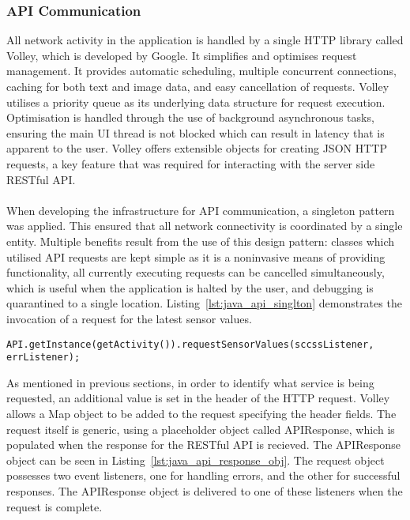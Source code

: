 \documentclass{article}
\begin{document}
\subsubsection{API Communication}
All network activity in the application is handled by a single HTTP library called Volley, which is developed by Google. It simplifies and optimises request management. It provides automatic scheduling, multiple concurrent connections, caching for both text and image data, and easy cancellation of requests. Volley utilises a priority queue as its underlying data structure for request execution. Optimisation is handled through the use of background asynchronous tasks, ensuring the main UI thread is not blocked which can result in latency that is apparent to the user. Volley offers extensible objects for creating JSON HTTP requests, a key feature that was required for interacting with the server side RESTful API.	\\\\
When developing the infrastructure for API communication, a singleton pattern was applied. This ensured that all network connectivity is coordinated by a single entity. Multiple benefits result from the use of this design pattern: classes which utilised API requests are kept simple as it is a noninvasive means of providing functionality, all currently executing requests can be cancelled simultaneously, which is useful when the application is halted by the user, and debugging is quarantined to a single location. Listing~\ref{lst:java_api_singlton} demonstrates the invocation of a request for the latest sensor values. 

\begin{lstlisting}[caption={Singleton API object method invocation},label={lst:java_api_singlton}]
API.getInstance(getActivity()).requestSensorValues(sccssListener, errListener);
\end{lstlisting}

\noindent
As mentioned in previous sections, in order to identify what service is being requested, an additional value is set in the header of the HTTP request. Volley allows a Map object to be added to the request specifying the header fields. The request itself is generic, using a placeholder object called APIResponse, which is populated when the response for the RESTful API is recieved. The APIResponse object can be seen in Listing~\ref{lst:java_api_response_obj}. The request object possesses two event listeners, one for handling errors, and the other for successful responses. The APIResponse object is delivered to one of these listeners when the request is complete. 
\end{document}
